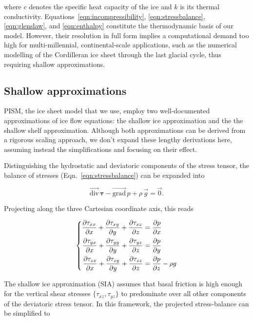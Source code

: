\documentclass{article}
\renewcommand{\grad}[1]{\vec{\mathrm{grad}}\,#1}
\newcommand{\tensdiv}[1]{\vec{\mathrm{div}}\,#1}
\newcommand{\eqn}[1]{Eqn.~\ref{eqn:#1}}
\begin{document}
where $c$ denotes the specific heat capacity of the ice and $k$ is its thermal
conductivity. Equations~\ref{eqn:incompressibility}, \ref{eqn:stressbalance},
\ref{eqn:glenslaw}, and \ref{eqn:enthalpy} constitute the thermodynamic basis
of our model. However, their resolution in full form implies a computational
demand too high for multi-millennial, continental-scale applications, such as
the numerical modelling of the Cordilleran ice sheet through the last glacial
cycle, thus requiring shallow approximations.

\subsection{Shallow approximations}

PISM, the ice sheet model that we use, employ two well-documented
approximations of ice flow equations: the shallow ice approximation and the
the shallow shelf approximation. Although both approximations can be derived
from a rigorous scaling approach, we don't expand these lengthy derivations
here, assuming instead the simplifications and focusing on their effect.


Distinguishing the hydrostatic and deviatoric components of the stress tensor,
the balance of stresses (\eqn{stressbalance}) can be expanded into

\begin{equation}
    \label{eqn:stressbalance}
    \tensdiv{\bm\tau} - \grad{p} + \rho\,\vec{g} = \vec{0}.
\end{equation}

Projecting along the three Cartesian coordinate axis, this reads

\begin{equation}
    \label{eqn:fullstokes}
    \left\{\begin{aligned}
        \pdv{\tau_{xx}}{x} + \pdv{\tau_{xy}}{y} + \pdv{\tau_{xz}}{z}
            &= \pdv{p}{x} \\
        \pdv{\tau_{yx}}{x} + \pdv{\tau_{yy}}{y} + \pdv{\tau_{yz}}{z}
            &= \pdv{p}{y} \\
        \pdv{\tau_{zx}}{x} + \pdv{\tau_{zy}}{y} + \pdv{\tau_{zz}}{z}
            &= \pdv{p}{z} - \rho g
    \end{aligned}\right.
\end{equation}

The shallow ice approximation (SIA) assumes that basal friction is high enough
for the vertical shear stresses $\{\tau_{xz}, \tau_{yz}\}$ to predominate over
all other components of the deviatoric stress tensor. In this framework, the
projected stress-balance can be simplified to
\end{document}
